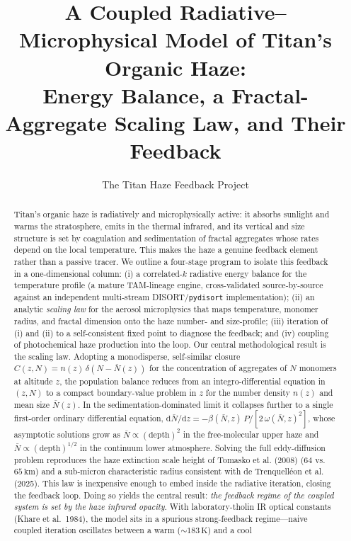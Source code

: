 \documentclass[11pt]{article}
\title{\bf A Coupled Radiative--Microphysical Model of Titan's Organic Haze:\\
  Energy Balance, a Fractal-Aggregate Scaling Law, and Their Feedback}
\author{The Titan Haze Feedback Project}
\affil{\small Working note --- compiled \today}
\date{}
\newcommand{\Nbar}{\bar{N}}
\newcommand{\dd}{\mathrm{d}}
\begin{document}
\maketitle

\begin{abstract}
\noindent
Titan's organic haze is radiatively and microphysically active: it absorbs
sunlight and warms the stratosphere, emits in the thermal infrared, and its
vertical and size structure is set by coagulation and sedimentation of fractal
aggregates whose rates depend on the local temperature. This makes the haze a
genuine feedback element rather than a passive tracer. We outline a four-stage
program to isolate this feedback in a one-dimensional column: (i) a correlated-$k$
radiative energy balance for the temperature profile (a mature TAM-lineage
engine, cross-validated source-by-source against an independent multi-stream
DISORT/\texttt{pydisort} implementation); (ii) an analytic \emph{scaling law} for the aerosol
microphysics that maps temperature, monomer radius, and fractal dimension onto
the haze number- and size-profile; (iii) iteration of (i) and (ii) to a
self-consistent fixed point to diagnose the feedback; and (iv) coupling of
photochemical haze production into the loop. Our central methodological result
is the scaling law. Adopting a monodisperse, self-similar closure
$C(z,N)=n(z)\,\delta(N-\Nbar(z))$ for the concentration of aggregates of $N$
monomers at altitude $z$, the population balance reduces from an
integro-differential equation in $(z,N)$ to a compact boundary-value problem in
$z$ for the number density $n(z)$ and mean size $\Nbar(z)$. In the
sedimentation-dominated limit it collapses further to a single first-order
ordinary differential equation, $\dd\Nbar/\dd z=-\beta(\Nbar,z)\,P/[2\,\omega(\Nbar,z)^2]$,
whose asymptotic solutions grow as $\Nbar\propto(\text{depth})^{2}$ in the
free-molecular upper haze and $\Nbar\propto(\text{depth})^{1/2}$ in the
continuum lower atmosphere. Solving the full eddy-diffusion problem reproduces
the haze extinction scale height of Tomasko et al. (2008)
($64$ vs.\ $65\,\mathrm{km}$) and a sub-micron characteristic radius consistent
with de Trenquell\'eon et al. (2025). This law is inexpensive enough to embed
inside the radiative iteration, closing the feedback loop. Doing so yields the
central result: \emph{the feedback regime of the coupled system is set by the
haze infrared opacity}.  With laboratory-tholin IR optical constants (Khare et
al.\ 1984), the model sits in a spurious strong-feedback regime---naive coupled
iteration oscillates between a warm ($\sim\!183\,\mathrm{K}$) and a cool

\end{abstract}
\end{document}
